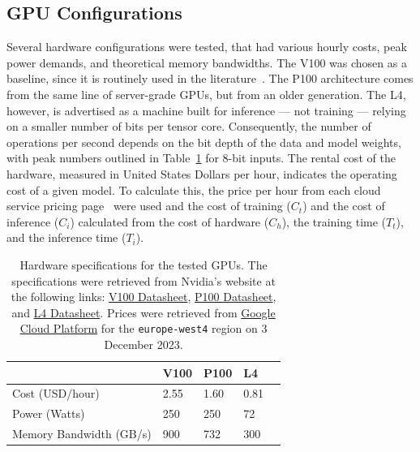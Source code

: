 \documentclass[sn-mathphys-num]{sn-jnl}%
\begin{document}
\subsection{GPU Configurations}

Several hardware configurations were tested, that had various hourly costs, peak power demands, and theoretical memory bandwidths. The V100 was chosen as a baseline, since it is routinely used in the literature~\cite{svedin2021benchmarking,xu2018deep}. The P100 architecture comes from the same line of server-grade GPUs, but from an older generation. The L4, however, is advertised as a machine built for inference --- not training --- relying on a smaller number of bits per tensor core. Consequently, the number of operations per second depends on the bit depth of the data and model weights, with peak numbers outlined in Table~\ref{tab:hardware} for 8-bit inputs. The rental cost of the hardware, measured in United States Dollars per hour, indicates the operating cost of a given model. To calculate this, the price per hour from each cloud service pricing page~\cite{pricing_1,pricing_2} were used and the cost of training ($C_{t}$) and the cost of inference ($C_{i}$) calculated from the cost of hardware ($C_{h}$), the training time ($T_{t}$), and the inference time ($T_{i}$).
\begin{table}[h]
    \centering
    \begin{tabular}{lllll}
    \toprule
                            & V100   & P100   & L4    &  \\
    \midrule
    Cost (USD/hour)         & 2.55   & 1.60   & 0.81   &  \\
    Power (Watts)           & 250    & 250    & 72    &  \\
    Memory Bandwidth (GB/s) & 900    & 732    & 300   &  \\
    \bottomrule
    \end{tabular}
    \caption{Hardware specifications for the tested GPUs. The specifications were retrieved from Nvidia's website at the following links: 
    \href{https://images.nvidia.com/content/technologies/volta/pdf/volta-v100-datasheet-update-us-1165301-r5.pdf}{V100 Datasheet},
    \href{https://images.nvidia.com/content/tesla/pdf/nvidia-tesla-p100-PCIe-datasheet.pdf}{P100 Datasheet}, and
    \href{https://nvdam.widen.net/s/rvq98gbwsw/l4-datasheet-2595652}{L4 Datasheet}. Prices were retrieved from \href{https://cloud.google.com/pricing/list}{Google Cloud Platform} for the \texttt{europe-west4} region on 3 December 2023.
    }
    \label{tab:hardware}
\end{table}
\end{document}

